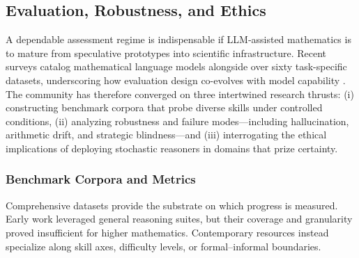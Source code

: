 \documentclass[acmsmall,anonymous]{acmart}
\begin{document}
\subsection{Evaluation, Robustness, and Ethics}\label{sec:evaluation}
A dependable assessment regime is indispensable if LLM‐assisted mathematics is to mature from speculative prototypes into scientific infrastructure.  Recent surveys catalog mathematical language models alongside over sixty task-specific datasets, underscoring how evaluation design co-evolves with model capability \cite{liu-2025-math-lm-survey}.  The community has therefore converged on three intertwined research thrusts: (i) constructing benchmark corpora that probe diverse skills under controlled conditions, (ii) analyzing robustness and failure modes—including hallucination, arithmetic drift, and strategic blindness—and (iii) interrogating the ethical implications of deploying stochastic reasoners in domains that prize certainty.

\subsubsection{Benchmark Corpora and Metrics}\label{sec:benchmarks}
Comprehensive datasets provide the substrate on which progress is measured.  Early work leveraged general reasoning suites, but their coverage and granularity proved insufficient for higher mathematics.  Contemporary resources instead specialize along skill axes, difficulty levels, or formal–informal boundaries.
\end{document}

